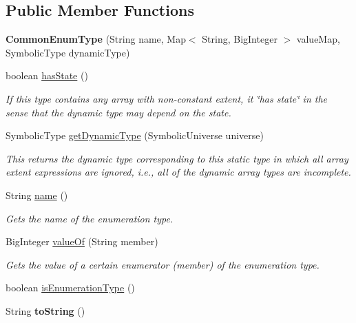\subsection*{Public Member Functions}
\begin{DoxyCompactItemize}
\item 
\hypertarget{classedu_1_1udel_1_1cis_1_1vsl_1_1civl_1_1model_1_1common_1_1type_1_1CommonEnumType_adac781fb172648a5c35a3a88885f8e91}{}{\bfseries Common\+Enum\+Type} (String name, Map$<$ String, Big\+Integer $>$ value\+Map, Symbolic\+Type dynamic\+Type)\label{classedu_1_1udel_1_1cis_1_1vsl_1_1civl_1_1model_1_1common_1_1type_1_1CommonEnumType_adac781fb172648a5c35a3a88885f8e91}

\item 
boolean \hyperlink{classedu_1_1udel_1_1cis_1_1vsl_1_1civl_1_1model_1_1common_1_1type_1_1CommonEnumType_a2b67cf75418c3dc9cb25fa8d7c16d3ce}{has\+State} ()
\begin{DoxyCompactList}\small\item\em If this type contains any array with non-\/constant extent, it \char`\"{}has state\char`\"{} in the sense that the dynamic type may depend on the state. \end{DoxyCompactList}\item 
Symbolic\+Type \hyperlink{classedu_1_1udel_1_1cis_1_1vsl_1_1civl_1_1model_1_1common_1_1type_1_1CommonEnumType_a249a80ddb40c76846065d851ee868edf}{get\+Dynamic\+Type} (Symbolic\+Universe universe)
\begin{DoxyCompactList}\small\item\em This returns the dynamic type corresponding to this static type in which all array extent expressions are ignored, i.\+e., all of the dynamic array types are incomplete. \end{DoxyCompactList}\item 
String \hyperlink{classedu_1_1udel_1_1cis_1_1vsl_1_1civl_1_1model_1_1common_1_1type_1_1CommonEnumType_a7ed52ce809393e0ec77f1dc3c0b865e3}{name} ()
\begin{DoxyCompactList}\small\item\em Gets the name of the enumeration type. \end{DoxyCompactList}\item 
Big\+Integer \hyperlink{classedu_1_1udel_1_1cis_1_1vsl_1_1civl_1_1model_1_1common_1_1type_1_1CommonEnumType_a32c48fbba9ca4711284e20504268bf65}{value\+Of} (String member)
\begin{DoxyCompactList}\small\item\em Gets the value of a certain enumerator (member) of the enumeration type. \end{DoxyCompactList}\item 
boolean \hyperlink{classedu_1_1udel_1_1cis_1_1vsl_1_1civl_1_1model_1_1common_1_1type_1_1CommonEnumType_a2ce8418efdcc31fcf9515d361309eadb}{is\+Enumeration\+Type} ()
\item 
\hypertarget{classedu_1_1udel_1_1cis_1_1vsl_1_1civl_1_1model_1_1common_1_1type_1_1CommonEnumType_ad8caeac802d4d01000dc98d9bc24f0ea}{}String {\bfseries to\+String} ()\label{classedu_1_1udel_1_1cis_1_1vsl_1_1civl_1_1model_1_1common_1_1type_1_1CommonEnumType_ad8caeac802d4d01000dc98d9bc24f0ea}


\end{DoxyCompactItemize}
